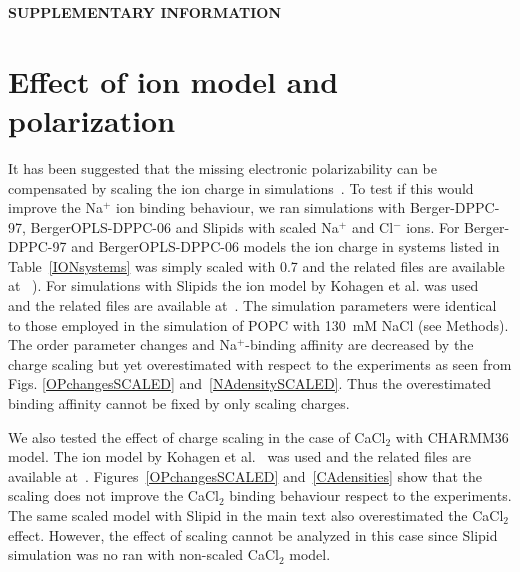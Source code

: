\documentclass[pre,aps,floatfix,authordate1-4,twocolumn]{revtex4-1}
\begin{document}
\newpage

\appendix
\begin{center}
{\bf SUPPLEMENTARY INFORMATION}
\end{center}

\section{Effect of ion model and polarization}
It has been suggested that the missing electronic polarizability 
can be compensated by scaling the ion charge in simulations~\cite{leontyev11}. 
To test if this would improve the Na$^+$ ion binding behaviour, we ran simulations with Berger-DPPC-97, BergerOPLS-DPPC-06
and Slipids with scaled Na$^+$ and Cl$^-$ ions. For Berger-DPPC-97 and BergerOPLS-DPPC-06 models 
the ion charge in systems listed in Table~\ref{IONsystems} was simply scaled with 0.7 and
the related files are available 
at ~\cite{DPPCBergerNaCl150mMscaled,DPPCBergerNaCl1000mMscaled,DPPCBergerOPLS06NaCl150mMscaled,DPPCBergerOPLS06NaCl1000mMscaled}). 
For simulations with Slipids the ion model by Kohagen et al. was used~\cite{kohagen15} and the related files are 
available at~\cite{slipidsFILESpopcSCALED}. The simulation parameters were identical to those employed in the simulation of POPC with 130~mM NaCl (see Methods).
The order parameter changes and Na$^+$-binding affinity are decreased by the charge scaling but 
yet overestimated with respect to the experiments as seen from Figs. \ref{OPchangesSCALED} and~\ref{NAdensitySCALED}. 
Thus the overestimated binding affinity cannot be fixed by only scaling charges.

We also tested the effect of charge scaling in the case of CaCl$_2$ with CHARMM36 model.
The ion model by Kohagen et al.~\cite{kohagen14} was used  and the related files are 
available at~\cite{charmmFILESpopc450mMcaclSCALED}. Figures~\ref{OPchangesSCALED} and~\ref{CAdensities}
show that the scaling does not improve the CaCl$_2$ binding behaviour respect to the
experiments. The same scaled model with Slipid in the main text also
overestimated the CaCl$_2$ effect. However, the effect of scaling cannot be analyzed in this case since
Slipid simulation was no ran with non-scaled CaCl$_2$ model.



\end{document}
